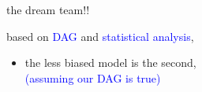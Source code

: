 %
%
\begin{lhframe}[rhgraphic={\texttt{[image: pipe1\_reg2.png]}}]
	{the dream team!!}
	
	based on \textcolor{blue}{DAG} and \textcolor{blue}{statistical analysis},
	\begin{itemize}
		\item the less biased model is the second, \\
		{\small \textcolor{blue}{(assuming our DAG is true)} }
	\end{itemize}
\end{lhframe}
%
%